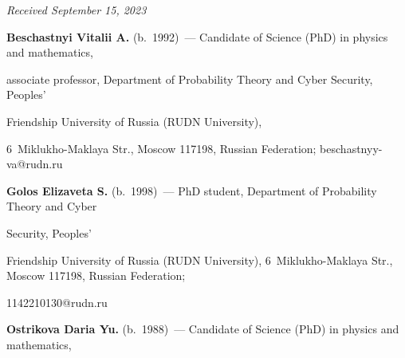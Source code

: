 \vspace*{-6pt}





\hfill{\small\textit{Received September 15, 2023}} 





\vspace*{-14pt} 


  


\Contr





\vspace*{-4pt}


  


\noindent


\textbf{Beschastnyi Vitalii A.} (b.\ 1992)~--- Candidate of Science (PhD) in physics and mathematics, 


associate professor, Department of Probability Theory and Cyber Security, Peoples' 


Friendship University of Russia (RUDN University), 


6~Miklukho-Maklaya Str., Moscow 117198, Russian Federation; \mbox{beschastnyy-va@rudn.ru}


  


\vspace*{3pt}


  


  \noindent


\textbf{Golos Elizaveta S.} (b.\ 1998)~--- PhD student, Department of Probability Theory and Cyber 


Security, Peoples' 


Friendship University of Russia (RUDN University), 6~Miklukho-Maklaya Str., Moscow 117198, Russian Federation; 


\mbox{1142210130@rudn.ru}


  


  \vspace*{3pt}


  


  \noindent


\textbf{Ostrikova Daria Yu.} (b.\ 1988)~--- Candidate of Science (PhD) in physics and mathematics, 


